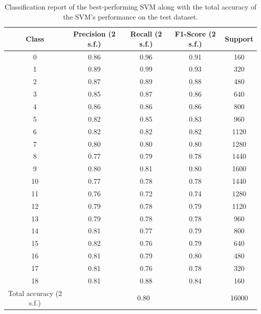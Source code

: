 \documentclass[11pt,a4paper]{article}
\begin{document}
\begin{table}[ht]
    \centering
    \begin{tabular}{c|c|c|c|c}
        Class & Precision (2 s.f.) & Recall (2 s.f.)& F1-Score (2 s.f.)& Support \\
        \hline
        0  & 0.86 & 0.96 & 0.91 & 160 \\
        1  & 0.89 & 0.99 & 0.93 & 320 \\
        2  & 0.87 & 0.89 & 0.88 & 480 \\
        3  & 0.85 & 0.87 & 0.86 & 640 \\
        4  & 0.86 & 0.86 & 0.86 & 800 \\
        5  & 0.82 & 0.85 & 0.83 & 960 \\
        6  & 0.82 & 0.82 & 0.82 & 1120 \\
        7  & 0.80 & 0.80 & 0.80 & 1280 \\
        8  & 0.77 & 0.79 & 0.78 & 1440 \\
        9  & 0.80 & 0.81 & 0.80 & 1600 \\
        10 & 0.77 & 0.78 & 0.78 & 1440 \\
        11 & 0.76 & 0.72 & 0.74 & 1280 \\
        12 & 0.79 & 0.78 & 0.79 & 1120 \\
        13 & 0.79 & 0.78 & 0.78 & 960 \\
        14 & 0.81 & 0.77 & 0.79 & 800 \\
        15 & 0.82 & 0.76 & 0.79 & 640 \\
        16 & 0.81 & 0.79 & 0.80 & 480 \\
        17 & 0.81 & 0.76 & 0.78 & 320 \\
        18 & 0.81 & 0.88 & 0.84 & 160 \\
        \hline
        Total accuracy (2 s.f.) &\multicolumn{3}{c|}{0.80} & 16000 \\

    \end{tabular}
    \caption{Classification report of the best-performing SVM along with the total accuracy of the SVM's performance on the test dataset.}\label{tab:svm_eval}
\end{table}
\end{document}
